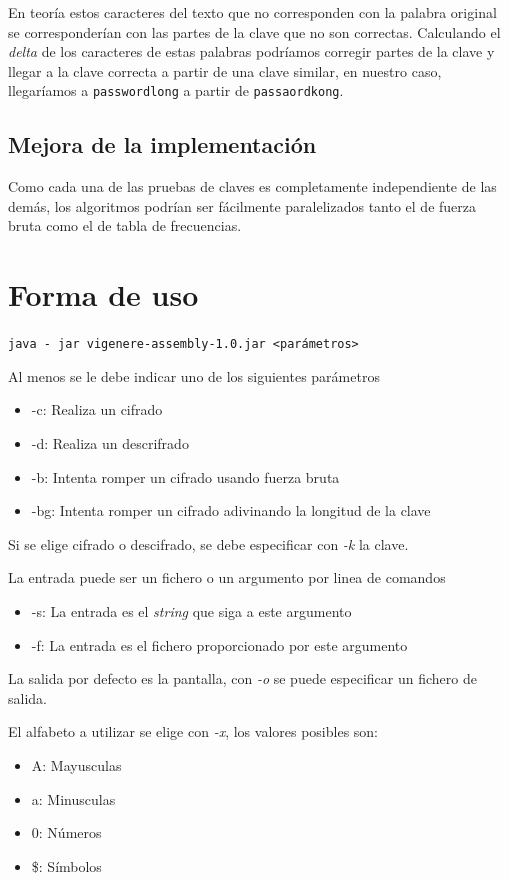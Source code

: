 \documentclass[12pt]{report}
\begin{document}
En teoría estos caracteres del texto que no corresponden con la palabra original se corresponderían con las partes de la clave que no
son correctas. Calculando el \textit{delta} de los caracteres de estas palabras podríamos corregir partes de la clave y llegar a la clave correcta a partir de una clave similar, en nuestro caso, llegaríamos a \texttt{passwordlong} a partir de \texttt{passaordkong}.

\subsection{Mejora de la implementación}
Como cada una de las pruebas de claves es completamente independiente de las demás, los algoritmos podrían ser fácilmente paralelizados tanto el de fuerza bruta como el de tabla de frecuencias.

\section{Forma de uso}
\texttt{java - jar vigenere-assembly-1.0.jar <parámetros>}

Al menos se le debe indicar uno de los siguientes parámetros
\begin{itemize}
\item -c: Realiza un cifrado
\item -d: Realiza un descrifrado
\item -b: Intenta romper un cifrado usando fuerza bruta
\item -bg: Intenta romper un cifrado adivinando la longitud de la clave
\end{itemize}

Si se elige cifrado o descifrado, se debe especificar con \textit{-k} la clave.

La entrada puede ser un fichero o un argumento por linea de comandos
\begin{itemize}
\item -s: La entrada es el \textit{string} que siga a este argumento
\item -f: La entrada es el fichero proporcionado por este argumento
\end{itemize}

La salida por defecto es la pantalla, con \textit{-o} se puede especificar un fichero de salida.

El alfabeto a utilizar se elige con \textit{-x}, los valores posibles son:
\begin{itemize}
\item A: Mayusculas
\item a: Minusculas
\item 0: Números
\item \$: Símbolos
\end{itemize}
\end{document}
